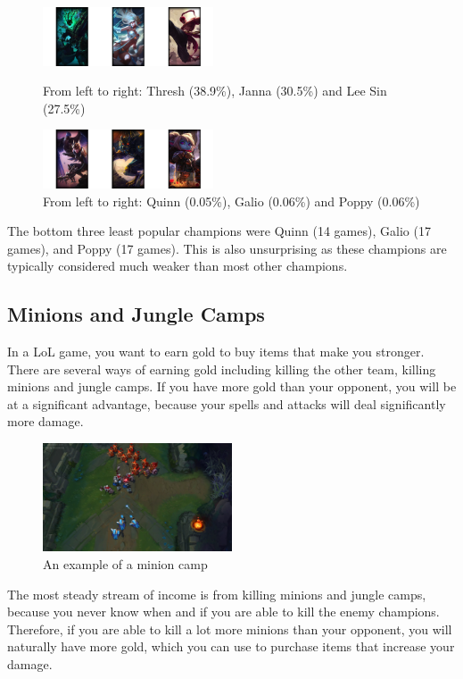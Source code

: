 \documentclass[runningheads]{llncs}
\begin{document}
	\begin{figure}
		\centering
		\includegraphics[width=0.45\textwidth]{images/top_3.png}
		\caption{From left to right: Thresh (38.9\%), Janna (30.5\%) and Lee Sin (27.5\%)}
		\includegraphics[width=0.45\textwidth]{images/bot_3.png}
		\caption{From left to right: Quinn (0.05\%), Galio (0.06\%) and Poppy (0.06\%)}
	\end{figure}
	
	The bottom three least popular champions were Quinn (14 games), Galio (17 games), and Poppy (17 games). This is also unsurprising as these champions are typically considered much weaker than most other champions.

	\subsection{Minions and Jungle Camps}
	
	In a LoL game, you want to earn gold to buy items that make you stronger. There are several ways of earning gold including killing the other team, killing minions and jungle camps. If you have more gold than your opponent, you will be at a significant advantage, because your spells and attacks will deal significantly more damage.

	\begin{figure}
		\centering
		\includegraphics[width=0.5\textwidth]{images/minions.jpg}
		\caption{An example of a minion camp}
	\end{figure}

	The most steady stream of income is from killing minions and jungle camps, because you never know when and if you are able to kill the enemy champions. Therefore, if you are able to kill a lot more minions than your opponent, you will naturally have more gold, which you can use to purchase items that increase your damage. 
\end{document}
